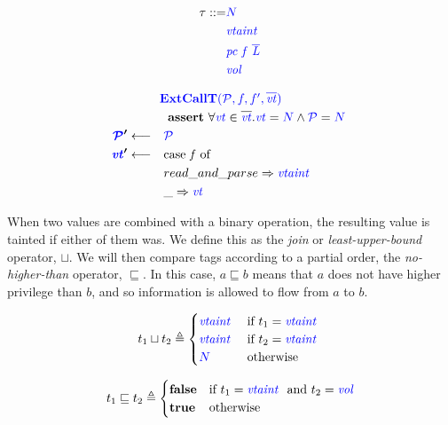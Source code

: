 \documentclass{llncs}
\begin{document}
\begin{minipage}{0.25\textwidth}
{ \color{blue}
  \begin{align*}
    \tau ::= & {\color{blue} N} \\
    & \mathit{\color{blue} vtaint ~ } \\
    & \mathit{\color{blue} pc ~ f ~ \overline{L}} \\
    & \mathit{\color{blue} vol} \\
\end{align*} }
\end{minipage}
\begin{minipage}{0.74\textwidth}
\[\begin{aligned}
\truledef{\extcallt}
\assert{\forall \vt \in \overline{\vt} . \vt = \N \land \PCT = \N}
\settag{\PCT'}{\PCT}
\settag{\vt'}{\caseof{f}}
\caseentry{read\_and\_parse}{\vtaint{}} \\
\caseentry{\_}{\vt} \\
\end{aligned}\]
\end{minipage}

When two values are combined with a binary operation, the resulting value is tainted
if either of them was. We define this as the {\em join} or {\em least-upper-bound}
operator, \(\sqcup\). We will then compare tags according to a partial order, the
{\em no-higher-than} operator, \(\sqsubseteq\). In this case, \(a \sqsubseteq b\)
means that \(a\) does not have higher privilege than \(b\), and so information is
allowed to flow from \(a\) to \(b\).

\begin{minipage}[t]{.49\textwidth}
\[t_1 \sqcup t_2 \triangleq
\begin{cases}
  \mathit{\color{blue} vtaint ~ } & \textnormal{if } t_1 = \mathit{\color{blue} vtaint ~ } \\
  \mathit{\color{blue} vtaint ~ } & \textnormal{if } t_2 = \mathit{\color{blue} vtaint ~ } \\
  {\color{blue} N} & \textnormal{otherwise} \\
\end{cases}\]
\end{minipage}
\begin{minipage}[t]{.49\textwidth}
\[t_1 \sqsubseteq t_2 \triangleq
\begin{cases}
  \mathbf{false} & \textnormal{if } t_1 = \mathit{\color{blue} vtaint ~ } \textnormal{ and } t_2 = \mathit{\color{blue} vol} \\
  \mathbf{true} & \textnormal{otherwise} \\
\end{cases}\]
\end{minipage}
\end{document}
